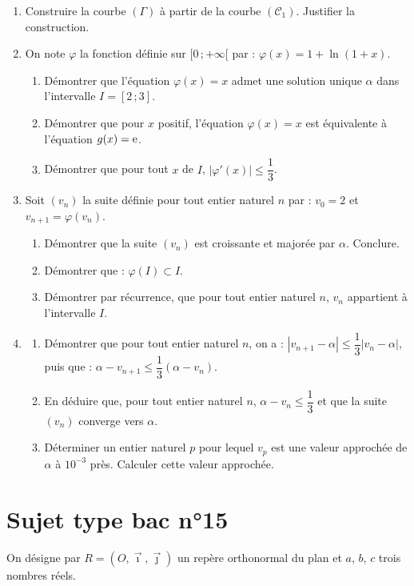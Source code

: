 \begin{enumerate}
	\item Construire la courbe $(\Gamma)$ à partir de la courbe $(\mathscr{C}_1)$. Justifier la construction.
	\item On note $\varphi$ la fonction définie sur $[0\,;+\infty[$ par : $\varphi(x)=1+\ln(1+x)$.
	\begin{enumerate}
		\item Démontrer que l'équation $\varphi(x)=x$ admet une solution unique $\alpha$ dans l'intervalle $I=[2\,;3]$.
		\item Démontrer que pour $x$ positif, l'équation $\varphi(x)=x$ est équivalente à l'équation $g(x)=\mathrm{e}$.
		\item Démontrer que pour tout $x$ de $I$, $|\varphi'(x)|\leqslant\dfrac13$.
	\end{enumerate}
	\item Soit $(v_n)$ la suite définie pour tout entier naturel $n$ par : $v_0=2$ et $v_{n+1}=\varphi(v_n)$.
	\begin{enumerate}
		\item Démontrer que la suite $(v_n)$ est croissante et majorée par $\alpha$. Conclure.
		\item Démontrer que : $\varphi(I)\subset I$.
		\item Démontrer par récurrence, que pour tout entier naturel $n$, $v_n$ appartient à l'intervalle $I$.
	\end{enumerate}
	\item
	\begin{enumerate}
		\item Démontrer que pour tout entier naturel $n$, on a : $|v_{n+1}-\alpha|\leqslant\dfrac13|v_n-\alpha|$, puis que : $\alpha-v_{n+1}\leqslant\dfrac13(\alpha-v_n)$.
		\item En déduire que, pour tout entier naturel $n$, $\alpha-v_n\leqslant\dfrac13$ et que la suite $(v_n)$ converge vers $\alpha$.
		\item Déterminer un entier naturel $p$ pour lequel $v_p$ est une valeur approchée de $\alpha$ à $10^{-3}$ près. Calculer cette valeur approchée.
	\end{enumerate}
\end{enumerate}


\section*{Sujet type bac n°15}

On désigne par $R=(O,\vec{\imath},\vec{\jmath})$ un repère orthonormal du plan et $a$, $b$, $c$ trois nombres réels.

